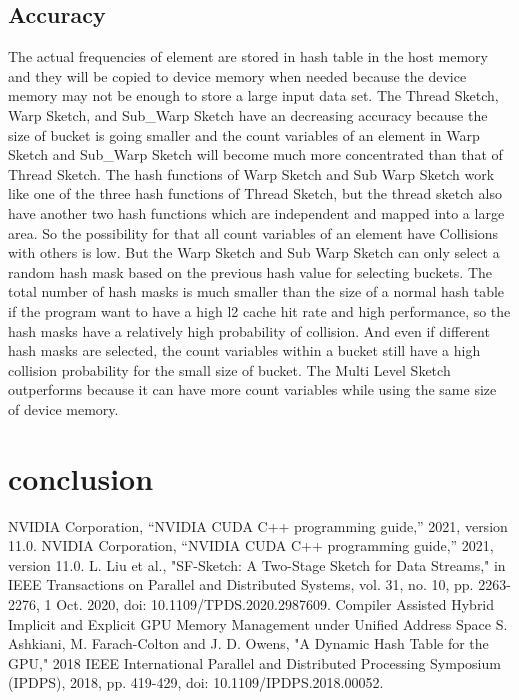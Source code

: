 \documentclass[conference]{IEEEtran}
\begin{document}
\subsection{Accuracy}
The actual frequencies of element are stored in hash table in the host memory and they will be copied to device memory when needed because the device memory may not be enough to store a large input data set. The Thread Sketch, Warp Sketch, and Sub\_Warp Sketch have an decreasing accuracy because the size of bucket is going smaller and the count variables of an element in Warp Sketch and Sub\_Warp Sketch will become much more concentrated than that of Thread Sketch. The hash functions of Warp Sketch and Sub Warp Sketch work like one of the three hash functions of Thread Sketch, but the thread sketch also have another two hash functions which are independent and mapped into a large area. So the possibility for that all count variables of an element have Collisions with others is low. But the Warp Sketch and Sub Warp Sketch can only select a random hash mask based on the previous hash value for selecting buckets. The total number of hash masks is much smaller than the size of a normal hash table if the program want to have a high l2 cache hit rate and high performance, so the hash masks have a relatively high probability of collision. And even if different hash masks are selected, the count variables within a bucket still have a high collision probability for the small size of bucket. The Multi Level Sketch outperforms because it can have more count variables while using the same size of device memory.


\section{conclusion}

\begin{thebibliography}{00}
 NVIDIA Corporation, “NVIDIA CUDA C++ programming guide,” 2021, version 11.0.
 NVIDIA Corporation, “NVIDIA CUDA C++ programming guide,” 2021, version 11.0.
 L. Liu et al., "SF-Sketch: A Two-Stage Sketch for Data Streams," in IEEE Transactions on Parallel and Distributed Systems, vol. 31, no. 10, pp. 2263-2276, 1 Oct. 2020, doi: 10.1109/TPDS.2020.2987609.
 Compiler Assisted Hybrid Implicit and Explicit GPU Memory Management under Unified Address Space %
 S. Ashkiani, M. Farach-Colton and J. D. Owens, "A Dynamic Hash Table for the GPU," 2018 IEEE International Parallel and Distributed Processing Symposium (IPDPS), 2018, pp. 419-429, doi: 10.1109/IPDPS.2018.00052.


\end{thebibliography}
\end{document}
